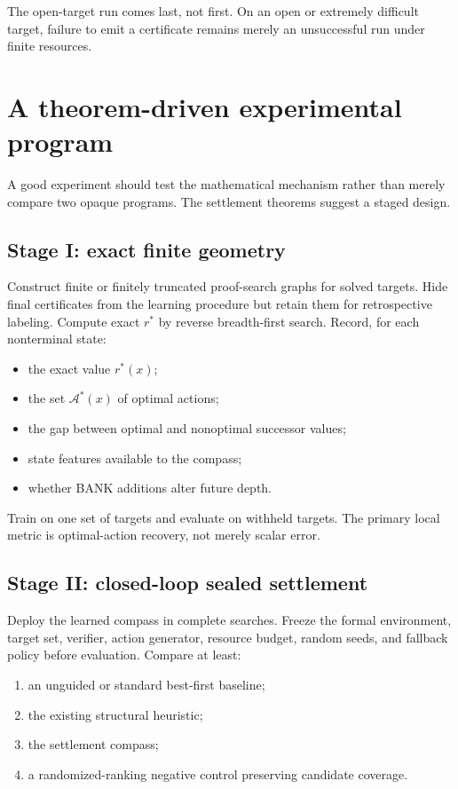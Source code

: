 \documentclass[11pt,letterpaper]{article}
\theoremstyle{remark}
\newcommand{\A}{\mathcal A}
\newcommand{\rstar}{r^{\!*}}
\begin{document}
The open-target run comes last, not first. On an open or extremely difficult target, failure to emit a certificate remains merely an unsuccessful run under finite resources.

\section{A theorem-driven experimental program}\label{sec:experiments}

A good experiment should test the mathematical mechanism rather than merely compare two opaque programs. The settlement theorems suggest a staged design.

\subsection{Stage I: exact finite geometry}

Construct finite or finitely truncated proof-search graphs for solved targets. Hide final certificates from the learning procedure but retain them for retrospective labeling. Compute exact $\rstar$ by reverse breadth-first search. Record, for each nonterminal state:
\begin{itemize}
\item the exact value $\rstar(x)$;
\item the set $\A^*(x)$ of optimal actions;
\item the gap between optimal and nonoptimal successor values;
\item state features available to the compass;
\item whether BANK additions alter future depth.
\end{itemize}

Train on one set of targets and evaluate on withheld targets. The primary local metric is optimal-action recovery, not merely scalar error.

\subsection{Stage II: closed-loop sealed settlement}

Deploy the learned compass in complete searches. Freeze the formal environment, target set, verifier, action generator, resource budget, random seeds, and fallback policy before evaluation. Compare at least:
\begin{enumerate}
\item an unguided or standard best-first baseline;
\item the existing structural heuristic;
\item the settlement compass;
\item a randomized-ranking negative control preserving candidate coverage.
\end{enumerate}
\end{document}
